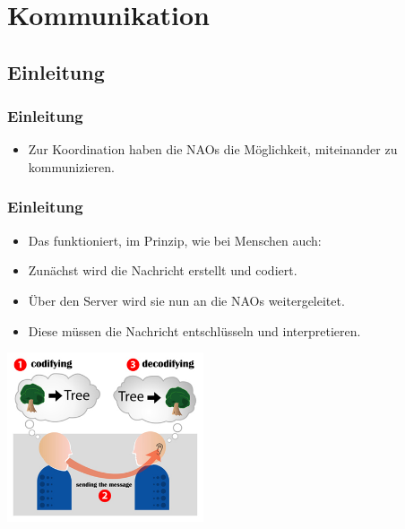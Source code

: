 
\section{Kommunikation}
\begin{frame}
\tableofcontents[currentsection]
\end{frame}

\subsection{Einleitung}
\frame
{
  \frametitle{Einleitung}
  \begin{itemize}
    \item Zur Koordination haben die NAOs die M\"oglichkeit, miteinander zu kommunizieren.
  \end{itemize}
}
  
\frame
{
  \frametitle{Einleitung}
  \begin{itemize}
    \item<1-> Das funktioniert, im Prinzip, wie bei Menschen auch:
    \item<2-> Zun\"achst wird die Nachricht erstellt und codiert.
    \item<3-> \"Uber den Server wird sie nun an die NAOs weitergeleitet.
    \item<4-> Diese m\"ussen die Nachricht entschl\"usseln und interpretieren.
  \end{itemize}
  
  \begin{center}\includegraphics[height=5cm, center]{Encoding_communication.jpg}\end{center}
}

